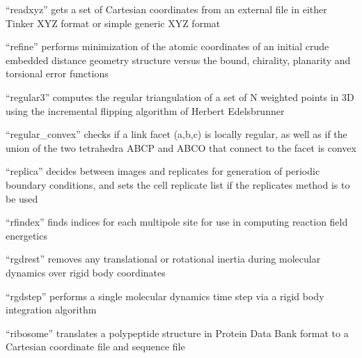 \documentclass[letterpaper,11pt,english]{sphinxmanual}
\begin{document}
\sphinxAtStartPar
{}

\sphinxAtStartPar
“readxyz” gets a set of Cartesian coordinates from an external file in either Tinker XYZ format or simple generic XYZ format

\sphinxAtStartPar
{}

\sphinxAtStartPar
“refine” performs minimization of the atomic coordinates of an initial crude embedded distance geometry structure versus the bound, chirality, planarity and torsional error functions

\sphinxAtStartPar
{}

\sphinxAtStartPar
“regular3” computes the regular triangulation of a set of N weighted points in 3D using the incremental flipping algorithm of Herbert Edelsbrunner

\sphinxAtStartPar
{}

\sphinxAtStartPar
“regular\_convex” checks if a link facet (a,b,c) is locally regular, as well as if the union of the two tetrahedra ABCP and ABCO that connect to the facet is convex

\sphinxAtStartPar
{}

\sphinxAtStartPar
{}

\sphinxAtStartPar
“replica” decides between images and replicates for generation of periodic boundary conditions, and sets the cell replicate list if the replicates method is to be used

\sphinxAtStartPar
{}

\sphinxAtStartPar
“rfindex” finds indices for each multipole site for use in computing reaction field energetics

\sphinxAtStartPar
{}

\sphinxAtStartPar
“rgdrest” removes any translational or rotational inertia during molecular dynamics over rigid body coordinates

\sphinxAtStartPar
{}

\sphinxAtStartPar
“rgdstep” performs a single molecular dynamics time step via a rigid body integration algorithm

\sphinxAtStartPar
{}

\sphinxAtStartPar
“ribosome” translates a polypeptide structure in Protein Data Bank format to a Cartesian coordinate file and sequence file
\end{document}
